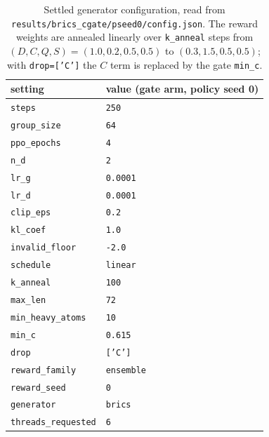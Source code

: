 \documentclass[10pt,letterpaper]{article}
\begin{document}
\begin{table}[!htbp]\centering\small
\caption{Settled generator configuration, read from \texttt{results/brics\_cgate/pseed0/config.json}. The reward weights are annealed linearly over \texttt{k\_anneal} steps from $(D,C,Q,S)=(1.0,0.2,0.5,0.5)$ to $(0.3,1.5,0.5,0.5)$; with \texttt{drop=['C']} the $C$ term is replaced by the gate \texttt{min\_c}.}
\label{tab:s10}
\begin{tabular}{@{}ll@{}}\toprule
setting & value (gate arm, policy seed 0)\\\midrule
\texttt{steps} & \texttt{250}\\
\texttt{group\_size} & \texttt{64}\\
\texttt{ppo\_epochs} & \texttt{4}\\
\texttt{n\_d} & \texttt{2}\\
\texttt{lr\_g} & \texttt{0.0001}\\
\texttt{lr\_d} & \texttt{0.0001}\\
\texttt{clip\_eps} & \texttt{0.2}\\
\texttt{kl\_coef} & \texttt{1.0}\\
\texttt{invalid\_floor} & \texttt{-2.0}\\
\texttt{schedule} & \texttt{linear}\\
\texttt{k\_anneal} & \texttt{100}\\
\texttt{max\_len} & \texttt{72}\\
\texttt{min\_heavy\_atoms} & \texttt{10}\\
\texttt{min\_c} & \texttt{0.615}\\
\texttt{drop} & \texttt{['C']}\\
\texttt{reward\_family} & \texttt{ensemble}\\
\texttt{reward\_seed} & \texttt{0}\\
\texttt{generator} & \texttt{brics}\\
\texttt{threads\_requested} & \texttt{6}\\
\bottomrule\end{tabular}
\end{table}

\FloatBarrier
\end{document}
